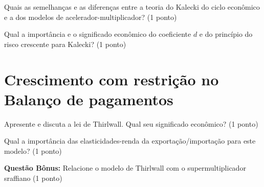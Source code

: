 \documentclass[12pt,a4paper]{article}
\begin{document}
\problem Quais as semelhanças e as diferenças entre a teoria do Kalecki do ciclo econômico e a dos modelos de acelerador-multiplicador? (1 ponto)


\problem Qual a importância e o significado econômico do coeficiente $d$ e do princípio do risco crescente para Kalecki? (1 ponto)

\section*{Crescimento com restrição no Balanço de pagamentos}

\problem Apresente e discuta a lei de Thirlwall. Qual seu significado econômico? (1 ponto)

\problem Qual a importância das elasticidades-renda da exportação/importação para este modelo? (1 ponto)

\noindent\textbf{Questão Bônus:} Relacione o modelo de Thirlwall com o supermultiplicador sraffiano (1 ponto)
\end{document}
